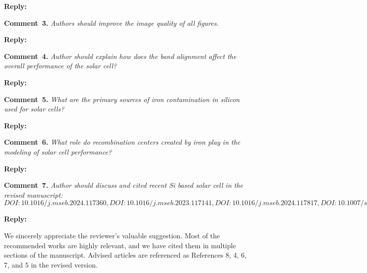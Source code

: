 \documentclass[a4paper,fleqn]{cas-sc}
\begin{document}
\noindent
\textcolor[rgb]{0.51,0.00,0.00}{\textbf{Reply:}}




\noindent
\textcolor[rgb]{0.00,0.50,1.00}{\textbf{Comment~3.}}
\emph{Authors should improve the image quality of all figures.}


\noindent
\textcolor[rgb]{0.51,0.00,0.00}{\textbf{Reply:}}




\noindent
\textcolor[rgb]{0.00,0.50,1.00}{\textbf{Comment~4.}}
\emph{Author should explain how does the band alignment affect the overall performance of the solar cell?}


\noindent
\textcolor[rgb]{0.51,0.00,0.00}{\textbf{Reply:}}




\noindent
\textcolor[rgb]{0.00,0.50,1.00}{\textbf{Comment~5.}}
\emph{What are the primary sources of iron contamination in silicon used for solar cells?}


\noindent
\textcolor[rgb]{0.51,0.00,0.00}{\textbf{Reply:}}




\noindent
\textcolor[rgb]{0.00,0.50,1.00}{\textbf{Comment~6.}}
\emph{What role do recombination centers created by iron play in the modeling of solar cell performance?}


\noindent
\textcolor[rgb]{0.51,0.00,0.00}{\textbf{Reply:}}




\noindent
\textcolor[rgb]{0.00,0.50,1.00}{\textbf{Comment~7.}}
\emph{Author should discuss and cited recent Si based solar cell in the revised manuscript:
$DOI:10.1016/j.mseb.2024.117360,
DOI:10.1016/j.mseb.2023.117141,
DOI:10.1016/j.mseb.2024.117817,
DOI:10.1007/s42247-024-00821-y,
DOI:10.1016/j.inoche.2024.112785$}

\noindent
\textcolor[rgb]{0.51,0.00,0.00}{\textbf{Reply:}}


We sincerely appreciate the reviewer’s valuable suggestion.
Most of the recommended works are highly relevant, and we have cited them in multiple sections of the manuscript.
Advised articles are referenced as References 8, 4, 6, 7, and 5 in the revised version.
\end{document}
